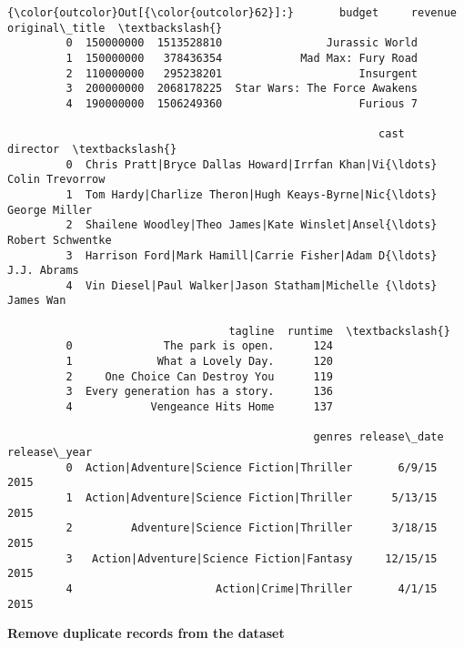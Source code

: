 \documentclass[11pt]{article}
\begin{document}
\begin{Verbatim}[commandchars=\\\{\}]
{\color{outcolor}Out[{\color{outcolor}62}]:}       budget     revenue                original\_title  \textbackslash{}
         0  150000000  1513528810                Jurassic World   
         1  150000000   378436354            Mad Max: Fury Road   
         2  110000000   295238201                     Insurgent   
         3  200000000  2068178225  Star Wars: The Force Awakens   
         4  190000000  1506249360                     Furious 7   
         
                                                         cast          director  \textbackslash{}
         0  Chris Pratt|Bryce Dallas Howard|Irrfan Khan|Vi{\ldots}   Colin Trevorrow   
         1  Tom Hardy|Charlize Theron|Hugh Keays-Byrne|Nic{\ldots}     George Miller   
         2  Shailene Woodley|Theo James|Kate Winslet|Ansel{\ldots}  Robert Schwentke   
         3  Harrison Ford|Mark Hamill|Carrie Fisher|Adam D{\ldots}       J.J. Abrams   
         4  Vin Diesel|Paul Walker|Jason Statham|Michelle {\ldots}         James Wan   
         
                                  tagline  runtime  \textbackslash{}
         0              The park is open.      124   
         1             What a Lovely Day.      120   
         2     One Choice Can Destroy You      119   
         3  Every generation has a story.      136   
         4            Vengeance Hits Home      137   
         
                                               genres release\_date  release\_year  
         0  Action|Adventure|Science Fiction|Thriller       6/9/15          2015  
         1  Action|Adventure|Science Fiction|Thriller      5/13/15          2015  
         2         Adventure|Science Fiction|Thriller      3/18/15          2015  
         3   Action|Adventure|Science Fiction|Fantasy     12/15/15          2015  
         4                      Action|Crime|Thriller       4/1/15          2015  
\end{Verbatim}
            
    \textbf{Remove duplicate records from the dataset}
\end{document}
